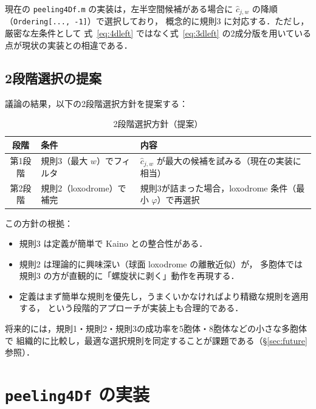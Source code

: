 \documentclass[12pt,a4paper]{article}
\theoremstyle{definition}
\begin{document}
現在の \texttt{peeling4Df.m} の実装は，左半空間候補がある場合に
$\hat{c}_{j,w}$ の降順（\texttt{Ordering[..., -1]}）で選択しており，
概念的に規則3 に対応する．ただし，厳密な左条件として
式~\eqref{eq:4dleft} ではなく式~\eqref{eq:3dleft} の2成分版を用いている点が現状の実装との相違である．

\subsection{2段階選択の提案}

議論の結果，以下の2段階選択方針を提案する：

\begin{table}[h]
\centering
\caption{2段階選択方針（提案）}
\label{tab:twostage}
\begin{tabular}{cll}
\toprule
段階 & 条件 & 内容 \\
\midrule
第1段階 & 規則3（最大 $w$）でフィルタ &
  $\hat{c}_{j,w}$ が最大の候補を試みる（現在の実装に相当） \\
第2段階 & 規則2（loxodrome）で補完 &
  規則3が詰まった場合，loxodrome 条件（最小 $\varphi$）で再選択 \\
\bottomrule
\end{tabular}
\end{table}

この方針の根拠：
\begin{itemize}
  \item 規則3 は定義が簡単で Kaino との整合性がある．
  \item 規則2 は理論的に興味深い（球面 loxodrome の離散近似）が，
    多胞体では規則3 の方が直観的に「螺旋状に剥く」動作を再現する．
  \item 定義はまず簡単な規則を優先し，うまくいかなければより精緻な規則を適用する，
    という段階的アプローチが実装上も合理的である．
\end{itemize}

将来的には，規則1・規則2・規則3の成功率を5胞体・8胞体などの小さな多胞体で
組織的に比較し，最適な選択規則を同定することが課題である（§\ref{sec:future} 参照）．

\section{\texttt{peeling4Df} の実装}
\end{document}

